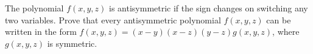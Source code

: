 The polynomial $f(x, y, z)$ is antisymmetric if the sign changes on switching any two variables. Prove that every antisymmetric polynomial $f(x, y, z)$ can be written in the form $f(x, y, z) = (x - y)(x - z)(y - z)g(x, y, z)$, where $g(x, y, z)$ is symmetric.
